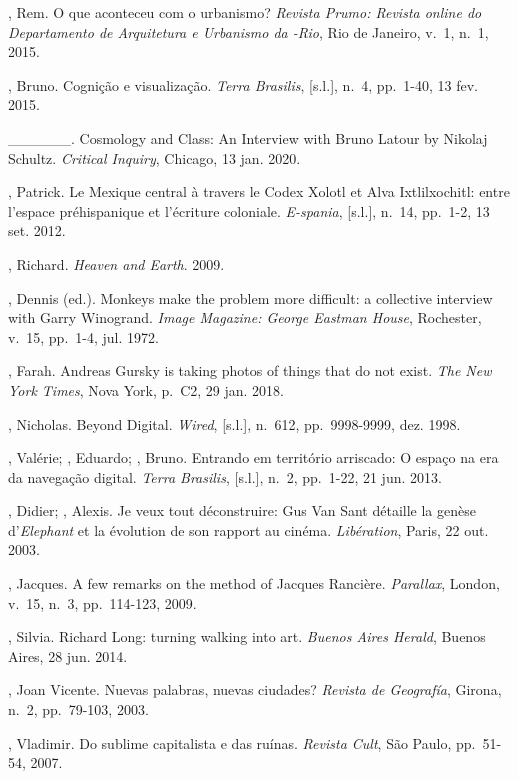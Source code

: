 \begin{Parskip}
, Rem. O que aconteceu com o urbanismo? \emph{Revista Prumo:
Revista online do Departamento de Arquitetura e Urbanismo da -Rio},
Rio de Janeiro, v.~1, n.~1, 2015.

, Bruno. Cognição e visualização. \emph{Terra Brasilis},
{[}s.l.{]}, n.~4, pp.~1-40, 13 fev. 2015.

\_\_\_\_\_\_. Cosmology and Class: An Interview with Bruno Latour by Nikolaj Schultz. \emph{Critical Inquiry}, Chicago, 13 jan. 2020. 

, Patrick. Le Mexique central à travers le Codex Xolotl et Alva
Ixtlilxochitl: entre l'espace préhispanique et l'écriture coloniale.
\emph{E-spania}, {[}s.l.{]}, n.~14, pp.~1-2, 13 set. 2012. 

, Richard. \emph{Heaven and Earth}. 2009. 

, Dennis (ed.). Monkeys make the problem more difficult: a
collective interview with Garry Winogrand. \emph{Image Magazine:
George Eastman House}, Rochester, v.~15, pp.~1-4, jul. 1972.

, Farah. Andreas Gursky is taking photos of things that do not
exist. \emph{The New York Times}, Nova York, p.~C2, 29 jan. 2018.

, Nicholas. Beyond Digital. \emph{Wired}, {[}s.l.{]}, n.~612, pp.~9998-9999, dez. 1998.

, Valérie; , Eduardo; , Bruno. Entrando em
território arriscado: O espaço na era da navegação digital.
\emph{Terra Brasilis}, {[}s.l.{]}, n.~2, pp.~1-22, 21 jun. 2013. 

, Didier; , Alexis. Je veux tout déconstruire: Gus Van Sant
détaille la genèse d'\emph{Elephant} et la évolution de son rapport au
cinéma. \emph{Libération}, Paris, 22 out. 2003.

, Jacques. A few remarks on the method of Jacques Rancière.
\emph{Parallax}, London, v.~15, n.~3, pp.~114-123, 2009. 

, Silvia. Richard Long: turning walking into art.
\emph{Buenos Aires Herald}, Buenos Aires, 28 jun. 2014.

, Joan Vicente. Nuevas palabras, nuevas ciudades? \emph{Revista
de Geografía}, Girona, n.~2, pp.~79-103, 2003.

, Vladimir. Do sublime capitalista e das ruínas. \emph{Revista
Cult}, São Paulo, pp.~51-54, 2007.


\end{Parskip}
